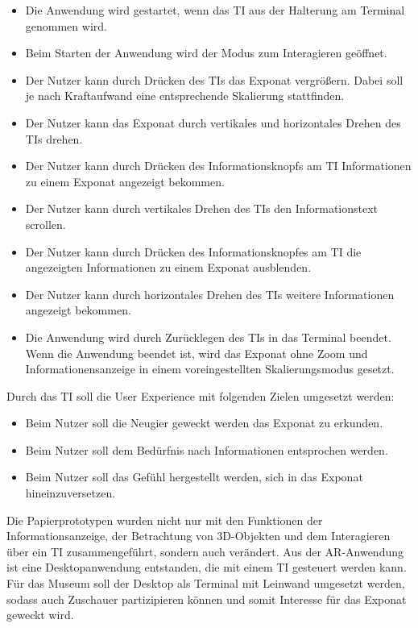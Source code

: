 \documentclass[runningheads,a4paper, 12pt]{llncs}
\begin{document}
\begin{itemize}
	\item Die Anwendung wird gestartet, wenn das TI aus der Halterung am Terminal genommen wird.
	\item Beim Starten der Anwendung wird der Modus zum Interagieren geöffnet.
	\item Der Nutzer kann durch  Drücken des TIs das Exponat vergrößern. Dabei soll je nach Kraftaufwand eine entsprechende Skalierung stattfinden. 
	\item Der Nutzer kann das Exponat durch vertikales und horizontales Drehen des TIs drehen.
	\item Der Nutzer kann durch Drücken des Informationsknopfs am TI Informationen zu einem Exponat angezeigt bekommen.
	\item Der Nutzer kann durch vertikales Drehen des TIs den Informationstext scrollen.
	\item Der Nutzer kann durch Drücken des Informationsknopfes am TI die angezeigten Informationen zu einem Exponat ausblenden.
	\item Der Nutzer kann durch horizontales Drehen des TIs weitere Informationen angezeigt bekommen.
	\item Die Anwendung wird durch Zurücklegen des TIs in das Terminal beendet.
	Wenn die Anwendung beendet ist, wird das Exponat ohne Zoom und Informationensanzeige in einem voreingestellten Skalierungsmodus gesetzt.
	
\end{itemize}

Durch das TI soll die User Experience mit folgenden Zielen umgesetzt werden:

\begin{itemize}
	\item Beim Nutzer soll die Neugier geweckt werden das Exponat zu erkunden.
	\item Beim Nutzer soll dem Bedürfnis nach Informationen entsprochen werden.
	\item Beim Nutzer soll das Gefühl hergestellt werden, sich in das Exponat hineinzuversetzen.
\end{itemize}

Die Papierprototypen wurden nicht nur mit den Funktionen der Informationsanzeige, der Betrachtung von 3D-Objekten und dem Interagieren über ein TI zusammengeführt, sondern auch verändert. Aus der AR-Anwendung ist eine Desktopanwendung entstanden, die mit einem TI gesteuert werden kann. Für das Museum soll der Desktop als Terminal mit Leinwand umgesetzt werden, sodass auch Zuschauer partizipieren können und somit Interesse für das Exponat geweckt wird.\\
\end{document}
